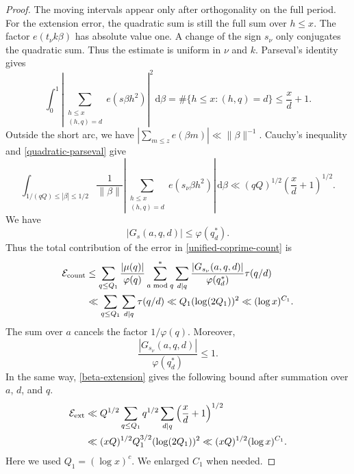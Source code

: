 \documentclass[12pt,reqno]{amsart}
\numberwithin{equation}{section}
\theoremstyle{plain}
\theoremstyle{remark}
\newcommand{\dif}{\mathrm{d}}
\begin{document}
\begin{proof}
The moving intervals appear only after orthogonality on the full
period.  For the extension error, the quadratic sum is still the full
sum over $h\leq x$.  The factor $e(t_\nu k\beta)$ has absolute value
one.  A change of the sign $s_\nu$ only conjugates the quadratic sum.
Thus the estimate is uniform in $\nu$ and $k$.  Parseval's identity gives
\begin{equation}\label{quadratic-parseval}
 \int_0^1\left|
 \sum_{\substack{h\leq x\\(h,q)=d}}e(s\beta h^2)
 \right|^2\,\dif\beta
 =\#\{h\leq x:(h,q)=d\}\leq\frac xd+1.
\end{equation}
Outside the short arc, we have
$|\sum_{m\leq z}e(\beta m)|\ll\|\beta\|^{-1}$.  Cauchy's inequality
and \eqref{quadratic-parseval} give
\begin{equation}\label{beta-extension}
 \int_{1/(qQ)\leq|\beta|\leq1/2}
 \frac1{\|\beta\|}
 \left|\sum_{\substack{h\leq x\\(h,q)=d}}e(s_\nu\beta h^2)\right|
 \,\dif\beta
\ll(qQ)^{1/2}\left(\frac xd+1\right)^{1/2}.
\end{equation}
We have
\[
 |G_s(a,q,d)|\leq\varphi(q^*_{d}).
\]
Thus the total contribution of the error in
\eqref{unified-coprime-count} is
\begin{align*}
 \mathcal E_{\mathrm{count}}
 &\leq \sum_{q\leq Q_1}\frac{|\mu(q)|}{\varphi(q)}
       \sum_{a\bmod q}^{*}\sum_{d\mid q}
       \frac{|G_{s_\nu}(a,q,d)|}{\varphi(q^*_{d})}
       \tau(q/d)\notag\\
 &\ll \sum_{q\leq Q_1}\sum_{d\mid q}\tau(q/d)
 \ll Q_1(\log(2Q_1))^2
 \ll(\log x)^{C_1}.                            \label{counting-error-sum}
\end{align*}
The sum over $a$ cancels the factor $1/\varphi(q)$.  Moreover,
\[
 \frac{|G_{s_\nu}(a,q,d)|}{\varphi(q^*_{d})}\leq1.
\]
In the same way,
\eqref{beta-extension} gives the following bound after summation over
$a$, $d$, and $q$.
\begin{align}
 \mathcal E_{\mathrm{ext}}
 &\ll Q^{1/2}\sum_{q\leq Q_1}q^{1/2}
       \sum_{d\mid q}\left(\frac xd+1\right)^{1/2}\notag\\
 &\ll (xQ)^{1/2}Q_1^{3/2}(\log(2Q_1))^2
 \ll (xQ)^{1/2}(\log x)^{C_1}.                 \label{extension-error-sum}
\end{align}
Here we used $Q_1=(\log x)^c$.  We enlarged $C_1$ when needed.


\end{proof}
\end{document}
